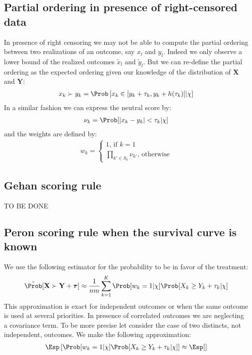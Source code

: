\documentclass[12pt]{article}
\newcommand\xobs{\tilde{x}}
\newcommand\yobs{\tilde{y}}
\newcommand\sample{\chi}
\newcommand\VX{\mathbf{X}}
\newcommand\VY{\mathbf{Y}}
\newcommand\Vtau{\boldsymbol{\tau}}
\begin{document}
\subsection{Partial ordering in presence of right-censored data}
\label{sec:org6dbef8b}
In presence of right censoring we may not be able to compute the
partial ordering between two realizations of an outcome, say \(x_l\)
and \(y_l\). Indeed we only observe a lower bound of the realized
outcomes \(\xobs_l\) and \(\yobs_l\). But we can re-define the partial
ordering as the expected ordering given our knowledge of the
distribution of \(\VX\) and \(\VY\):
\begin{align*}
x_k \succ y_k = \Prob\left[x_k \in [y_k + \tau_k, y_k + h(\tau_k)[ | \sample \right]
\end{align*}
In a similar fashion we can express the neutral score by:
\begin{align*}
\nu_k = \Prob[|x_k - y_k| < \tau_k | \sample] 
\end{align*}
and the weights are defined by:
\begin{align*}
w_k = \left\{ \begin{array}{c} 1\text{, if } k = 1 \\ \prod_{k' \in S_k} \nu_{k'} \text{, otherwise} \end{array} \right.
\end{align*}

\subsection{Gehan scoring rule}
\label{sec:orgc436b52}
TO BE DONE

\subsection{Peron scoring rule when the survival curve is known}
\label{sec:orgc986af3}

We use the following estimator for the probability to be in favor of
the treatment:
\begin{align*}
\hat{\Prob}[\VX \succ \VY + \Vtau] \approx \frac{1}{nm} \sum_{k=1}^K \Prob[w_k=1 |\sample]\Prob[X_k \geq Y_k + \tau_k|\sample]
\end{align*}
This approximation is exact for independent outcomes or when the same
outcome is used at several priorities. In presence of correlated
outcomes we are neglecting a covariance term. To be more precise let
consider the case of two distincts, not independent, outcomes. We make
the following approximation:
\begin{align*}
\Esp\left[ \Prob[w_k=1|\sample]\Prob[X_k \geq Y_k + \tau_k|\sample] \right] \approx \Esp[]
\end{align*}
\end{document}
